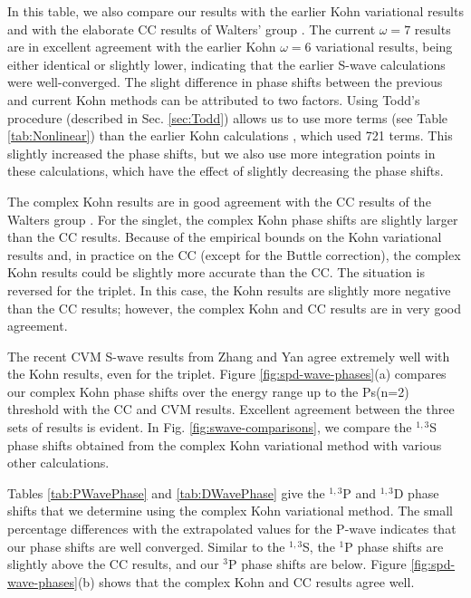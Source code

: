 \documentclass[preprint,showpacs,preprintnumbers,amsmath,amssymb,longbibliography,pra,aps]{revtex4-1}
\begin{document}
In this table, we also compare our results with the earlier Kohn variational results \cite{VanReeth2003,VanReeth2004} and with the elaborate CC results of Walters' group \cite{Blackwood2002,Walters2004}. The current $\omega = 7$ results are in excellent agreement with the earlier Kohn $\omega = 6$ variational results, being either identical or slightly lower, indicating that the earlier S-wave calculations were well-converged. The slight difference in phase shifts between the previous and current Kohn methods can be attributed to two factors. Using Todd's procedure (described in Sec. \ref{sec:Todd}) allows us to use more terms (see Table \ref{tab:Nonlinear}) than the earlier Kohn calculations \cite{VanReeth2003,VanReeth2004}, which used 721 terms. This slightly increased the phase shifts, but we also use more integration points in these calculations, which have the effect of slightly decreasing the phase shifts.

The complex Kohn results are in good agreement with the CC results of the Walters group \cite{Blackwood2002,Walters2004}. For the singlet, the complex Kohn phase shifts are slightly larger than the CC results. Because of the empirical bounds on the Kohn variational results and, in practice on the CC (except for the Buttle correction), the complex Kohn results could be slightly more accurate than the CC.
The situation is reversed for the triplet. In this case, the Kohn results are slightly more negative than the CC results; however, the complex Kohn and CC results are in very good agreement.

The recent CVM S-wave results from Zhang and Yan \cite{Zhang2012} agree extremely well with the Kohn results, even for the triplet. Figure \ref{fig:spd-wave-phases}(a) compares our complex Kohn phase shifts over the energy range up to the Ps(n=2) threshold with the CC and CVM results. Excellent agreement between the three sets of results is evident. In Fig. \ref{fig:swave-comparisons}, we compare the $^{1,3}$S phase shifts obtained from the complex Kohn variational method with various other calculations.

Tables \ref{tab:PWavePhase} and \ref{tab:DWavePhase} give the $^{1,3}$P and $^{1,3}$D phase shifts that we determine using the complex Kohn variational method. The small percentage differences with the extrapolated values for the P-wave indicates that our phase shifts are well converged. Similar to the $^{1,3}$S, the $^1$P phase shifts are slightly above the CC results, and our $^3$P phase shifts are below. Figure \ref{fig:spd-wave-phases}(b) shows that the complex Kohn and CC results agree well.
\end{document}
